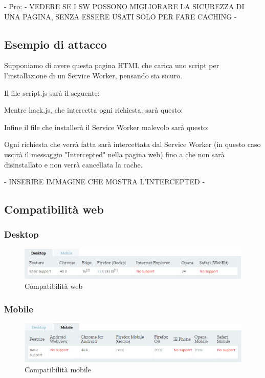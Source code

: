 \documentclass[11pt ,a4paper , twoside , openright ]{article}
\begin{document}
- Pro: - VEDERE SE I SW POSSONO MIGLIORARE LA SICUREZZA DI UNA PAGINA, SENZA ESSERE USATI SOLO PER FARE CACHING -

\subsection{Esempio di attacco}
Supponiamo di avere questa pagina HTML che carica uno script per l'installazione di un Service Worker, pensando sia sicuro.

Il file script.js sarà il seguente:


Mentre hack.js, che intercetta ogni richiesta, sarà questo:

Infine il file che installerà il Service Worker malevolo sarà questo:

Ogni richiesta che verrà fatta sarà intercettata dal Service Worker (in questo caso uscirà il messaggio "Intercepted" nella pagina web) fino a che non sarà disinstallato e non verrà cancellata la cache.

- INSERIRE IMMAGINE CHE MOSTRA L'INTERCEPTED -

\clearpage
\subsection{Compatibilità web}
\subsubsection{Desktop}
\begin{figure}[h]
	\centering
	\includegraphics[width=1\linewidth]{CompWeb}
	\caption{Compatibilità web}
	\label{fig:Compatibilità web}
\end{figure}
\subsubsection{Mobile}
\begin{figure}[h]
	\centering
	\includegraphics[width=1\linewidth]{CompMobile}
	\caption{Compatibilità mobile}
	\label{fig:Compatibilità mobile}
\end{figure}
\end{document}
